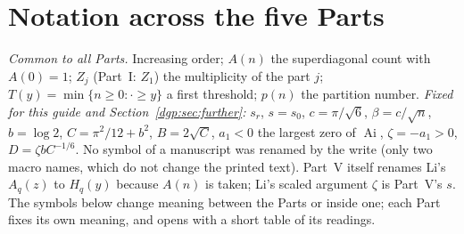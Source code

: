 \documentclass[11pt,letterpaper]{article}
\numberwithin{equation}{section}
\theoremstyle{remark}\newtheorem{remark}[theorem]{Remark}
\begin{document}
\section*{Notation across the five Parts}\label{dgp:sec:notation}
\emph{Common to all Parts.} Increasing order; $A(n)$ the superdiagonal count with $A(0)=1$; $Z_j$ (Part~I: $Z_1$) the multiplicity of the part $j$; $T(y)=\min\{n\ge0:\cdot\ge y\}$ a first threshold; $p(n)$ the partition number. \emph{Fixed for this guide and Section~\ref{dgp:sec:further}:} $s_r$, $s=s_0$, $c=\pi/\sqrt6$, $\beta=c/\sqrt n$, $b=\log2$, $C=\pi^2/12+b^2$, $B=2\sqrt C$, $a_1<0$ the largest zero of $\operatorname{Ai}$, $\zeta=-a_1>0$, $D=\zeta bC^{-1/6}$. No symbol of a manuscript was renamed by the write (only two macro names, which do not change the printed text). Part~V itself renames Li's $A_q(z)$ to $H_q(y)$ because $A(n)$ is taken; Li's scaled argument $\zeta$ is Part~V's $s$. The symbols below change meaning between the Parts or inside one; each Part fixes its own meaning, and opens with a short table of its readings.
\begingroup\small
\renewcommand{\theHtable}{notation.\arabic{table}}
\end{document}
